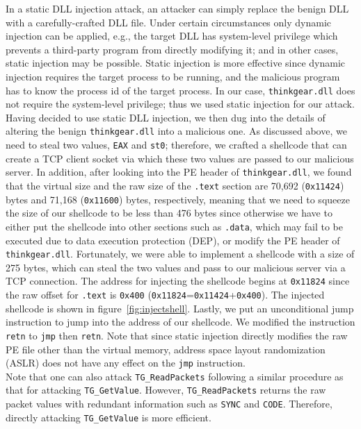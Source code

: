 In a static DLL injection attack, an attacker can simply replace the benign DLL with a carefully-crafted DLL file. Under certain circumstances only dynamic injection can be applied, e.g., the target DLL has system-level privilege which prevents a third-party program from directly modifying it; and in other cases, static injection may be possible. Static injection is more effective since dynamic injection requires the target process to be running, and the malicious program has to know the process id of the target process. In our case, \texttt{thinkgear.dll} does not require the system-level privilege; thus we used static injection for our attack.\\
%
\indent Having decided to use static DLL injection, we then dug into the details of altering the benign \texttt{thinkgear.dll} into a malicious one. As discussed above, we need to steal two values, \texttt{EAX} and \texttt{st0}; therefore, we crafted a shellcode that can create a TCP client socket via which these two values are passed to our malicious server. In addition, after looking into the PE header of \texttt{thinkgear.dll}, we found that the virtual size and the raw size of the \texttt{.text} section are 70,692 (\texttt{0x11424}) bytes and 71,168 (\texttt{0x11600}) bytes, respectively, meaning that we need to squeeze the size of our shellcode to be less than 476 bytes since otherwise we have to either put the shellcode into other sections such as \texttt{.data}, which may fail to be executed due to data execution protection (DEP), or modify the PE header of \texttt{thinkgear.dll}. Fortunately, we were able to implement a shellcode with a size of 275 bytes, which can steal the two values and pass to our malicious server via a TCP connection. The address for injecting the shellcode begins at \texttt{0x11824} since the raw offset for \texttt{.text} is \texttt{0x400} (\texttt{0x11824}=\texttt{0x11424}+\texttt{0x400}). The injected shellcode is shown in figure~\ref{fig:injectshell}. Lastly, we put an unconditional jump instruction to jump into the address of our shellcode. We modified the instruction \texttt{retn} to \texttt{jmp} then \texttt{retn}. Note that since static injection directly modifies the raw PE file other than the virtual memory, address space layout randomization (ASLR) does not have any effect on the \texttt{jmp} instruction.\\
%
\indent Note that one can also attack \texttt{TG\_ReadPackets} following a similar procedure as that for attacking \texttt{TG\_GetValue}. However, \texttt{TG\_ReadPackets} returns the raw packet values with redundant information such as \texttt{SYNC} and \texttt{CODE}. Therefore, directly attacking \texttt{TG\_GetValue} is more efficient.

